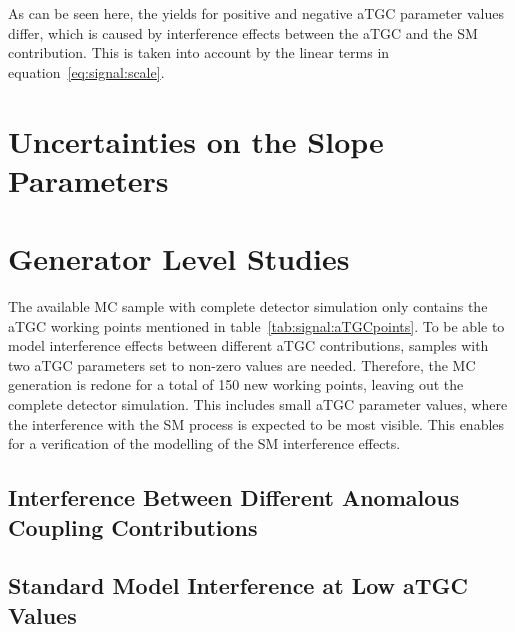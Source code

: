 As can be seen here, the yields for positive and negative aTGC parameter values differ, which is caused by interference effects between the aTGC and the SM contribution. This is taken into account by the linear terms in equation~\ref{eq:signal:scale}.\\


\label{sec:NormalizationandShapeoftheaTGCContribution}
\section{Uncertainties on the Slope Parameters}
\section{Generator Level Studies}
The available MC sample with complete detector simulation only contains the aTGC working points mentioned in table~\ref{tab:signal:aTGCpoints}. To be able to model interference effects between different aTGC contributions, samples with two aTGC parameters set to non-zero values are needed. Therefore, the MC generation is redone for a total of 150 new working points, leaving out the complete detector simulation. This includes small aTGC parameter values, where the interference with the SM process is expected to be most visible. This enables for a verification of the modelling of the SM interference effects.
\subsection{Interference Between Different Anomalous Coupling Contributions}

\subsection{Standard Model Interference at Low aTGC Values}
